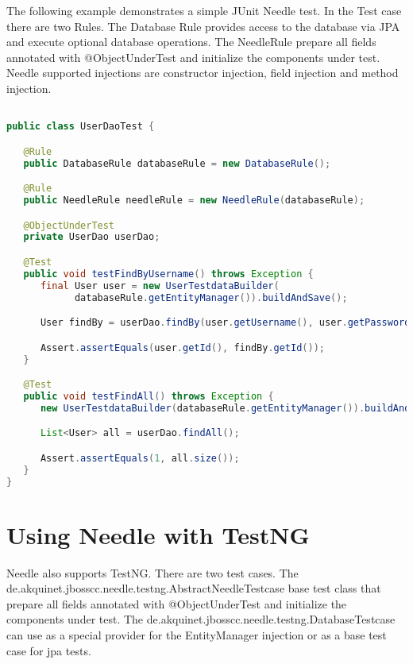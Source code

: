 The following example demonstrates a simple JUnit Needle test. In the Test case there are two Rules. The Database Rule provides access to the database via JPA and execute optional database operations. 
The NeedleRule prepare all fields annotated with @ObjectUnderTest and initialize the components under test. Needle supported injections are constructor injection, field injection and method injection.

\begin{lstlisting}[language={JAVA},caption=JUnit user dao test]

public class UserDaoTest {

   @Rule
   public DatabaseRule databaseRule = new DatabaseRule();

   @Rule
   public NeedleRule needleRule = new NeedleRule(databaseRule);

   @ObjectUnderTest
   private UserDao userDao;

   @Test
   public void testFindByUsername() throws Exception {
      final User user = new UserTestdataBuilder(
            databaseRule.getEntityManager()).buildAndSave();

      User findBy = userDao.findBy(user.getUsername(), user.getPassword());

      Assert.assertEquals(user.getId(), findBy.getId());
   }

   @Test
   public void testFindAll() throws Exception {
      new UserTestdataBuilder(databaseRule.getEntityManager()).buildAndSave();

      List<User> all = userDao.findAll();

      Assert.assertEquals(1, all.size());
   }
}
\end{lstlisting}

\section{Using Needle with TestNG}
\label{sec: TestNG}

Needle also supports TestNG. There are two test cases. The de.akquinet.jbosscc.needle.testng.AbstractNeedleTestcase base test class that prepare all fields annotated with @ObjectUnderTest and initialize the components under test. The de.akquinet.jbosscc.needle.testng.DatabaseTestcase can use as a special provider for the EntityManager injection or as a base test case for jpa tests.

